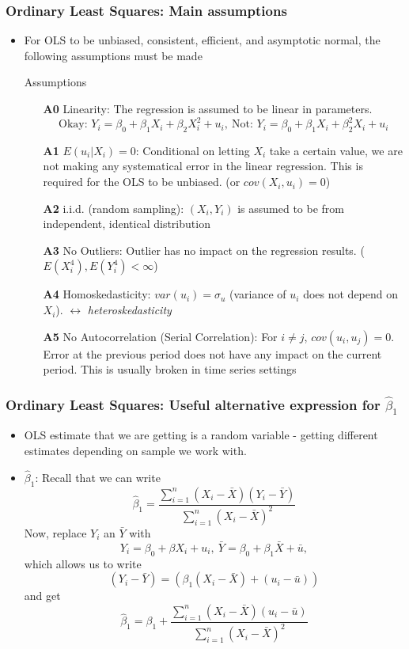 \documentclass[aspectratio=169]{beamer}
\begin{document}
\begin{frame}
\frametitle{Ordinary Least Squares: Main assumptions}
\begin{itemize}
\item For OLS to be unbiased, consistent, efficient, and asymptotic normal, the following assumptions must be made
\begin{block}{Assumptions}
\begin{itemize}
\item[\textbf{A0}] Linearity: The regression is assumed to be linear in parameters.
\[
\text{Okay: } Y_i = \beta_0 + \beta_1X_i + \beta_2X_i^2+u_i, \ \text{Not: } Y_i = \beta_0 + \beta_1X_i + \beta_2^2X_i+u_i
\]
\item[\textbf{A1}] $E(u_i|X_i)=0$: Conditional on letting $X_i$ take a certain value, we are not making any systematical error in the linear regression. This is required for the OLS to be unbiased. (or $cov(X_i, u_i)=0$)
\item[\textbf{A2}] i.i.d. (random sampling): $(X_i,Y_i)$ is assumed to be from independent, identical distribution
\item[\textbf{A3}] No Outliers: Outlier has no impact on the regression results. ($E(X_i^4), E(Y_i^4)<\infty$)
\item[\textbf{A4}] Homoskedasticity: $var(u_i)=\sigma_u$ (variance of $u_i$ does not depend on $X_i$). $\leftrightarrow$ \textit{heteroskedasticity}
\item[\textbf{A5}] No Autocorrelation (Serial Correlation): For $i\neq j$, $cov(u_i,u_j)=0$. Error at the previous period does not have any impact on the current period. This is usually broken in time series settings

\end{itemize}
\end{block}
\end{itemize}
\end{frame}


\begin{frame}
\frametitle{Ordinary Least Squares: Useful alternative expression for $\hat{\beta}_1$ }
\begin{itemize}
\item OLS estimate that we are getting is a random variable - getting different estimates depending on sample we work with. 
\item$\hat{\beta}_1$: Recall that we can write
\[
\hat{\beta}_1= \frac{\sum_{i=1}^n(X_i-\bar{X})(Y_i-\bar{Y})}{\sum_{i=1}^n(X_i-\bar{X})^2}
\]
Now, replace $Y_i$ an $\bar{Y}$ with 
\[
Y_i =\beta_0 + \beta X_i + u_i, \ \bar{Y} = \beta_0 + \beta_1\bar{X} + \bar{u},
\]
which allows us to write 
\[
(Y_i-\bar{Y}) = (\beta_1(X_i-\bar{X})+(u_i-\bar{u}))
\]
and get
\[
\hat{\beta}_1=\beta_1+  \frac{\sum_{i=1}^n(X_i-\bar{X})(u_i-\bar{u})}{\sum_{i=1}^n(X_i-\bar{X})^2}
\]

\end{itemize}
\end{frame}
\end{document}
